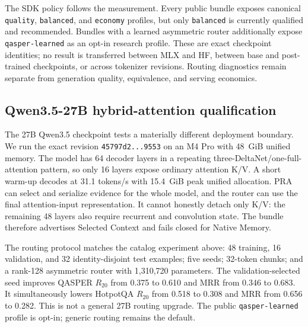 \documentclass[11pt]{article}
\begin{document}
The SDK policy follows the measurement. Every public bundle exposes canonical
\texttt{quality}, \texttt{balanced}, and \texttt{economy} profiles, but only
\texttt{balanced} is currently qualified and recommended. Bundles with a
learned asymmetric router additionally expose \texttt{qasper-learned} as an
opt-in research profile. These are exact checkpoint identities; no result is
transferred between MLX and HF, between base and post-trained checkpoints, or
across tokenizer revisions. Routing diagnostics remain separate from generation
quality, equivalence, and serving economics.

\subsection{Qwen3.5-27B hybrid-attention qualification}

The 27B Qwen3.5 checkpoint tests a materially different deployment boundary.
We run the exact  revision
\texttt{45797d2...9553} on an M4 Pro with 48~GiB unified memory. The model has
64 decoder layers in a repeating three-DeltaNet/one-full-attention pattern,
so only 16 layers expose ordinary attention K/V. A short warm-up decodes at
31.1 tokens/s with 15.4~GiB peak unified allocation. PRA can select and
serialize evidence for the whole model, and the router can use the final
attention-input representation. It cannot honestly detach only K/V: the
remaining 48 layers also require recurrent and convolution state. The bundle
therefore advertises Selected Context and fails closed for Native Memory.

The routing protocol matches the catalog experiment above: 48 training, 16
validation, and 32 identity-disjoint test examples; five seeds; 32-token
chunks; and a rank-128 asymmetric router with 1,310,720 parameters. The
validation-selected seed improves QASPER $R_{20}$ from 0.375 to 0.610 and MRR
from 0.346 to 0.683. It simultaneously lowers HotpotQA $R_{20}$ from 0.518 to
0.308 and MRR from 0.656 to 0.282. This is not a general 27B routing upgrade.
The public \texttt{qasper-learned} profile is opt-in; generic routing remains
the default.

\begin{table}[H]
\centering
\small
\caption{Qwen3.5-27B held-out routing at a 20\% chunk budget.}
\label{tab:qwen35-routing}

\end{table}
\end{document}
